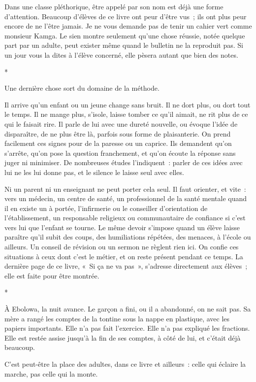 \documentclass[10.5pt,twoside,openright]{book}
\newcommand{\asterisme}{\par\vspace{0.7em}\centerline{\color{gris}*\quad*\quad*}\vspace{0.7em}\par\noindent}
\begin{document}
Dans une classe pléthorique, être appelé par son nom est déjà une forme d’attention. Beaucoup d’élèves de ce livre ont peur d’être vus ; ils ont plus peur encore de ne l’être jamais. Je ne vous demande pas de tenir un cahier vert comme monsieur Kamga. Le sien montre seulement qu’une chose réussie, notée quelque part par un adulte, peut exister même quand le bulletin ne la reproduit pas. Si un jour vous la dites à l’élève concerné, elle pèsera autant que bien des notes.

\asterisme

Une dernière chose sort du domaine de la méthode.

Il arrive qu’un enfant ou un jeune change sans bruit. Il ne dort plus, ou dort tout le temps. Il ne mange plus, s’isole, laisse tomber ce qu’il aimait, ne rit plus de ce qui le faisait rire. Il parle de lui avec une dureté nouvelle, ou évoque l’idée de disparaître, de ne plus être là, parfois sous forme de plaisanterie. On prend facilement ces signes pour de la paresse ou un caprice. Ils demandent qu’on s’arrête, qu’on pose la question franchement, et qu’on écoute la réponse sans juger ni minimiser. De nombreuses études l’indiquent : parler de ces idées avec lui ne les lui donne pas, et le silence le laisse seul avec elles.

Ni un parent ni un enseignant ne peut porter cela seul. Il faut orienter, et vite : vers un médecin, un centre de santé, un professionnel de la santé mentale quand il en existe un à portée, l’infirmerie ou le conseiller d’orientation de l’établissement, un responsable religieux ou communautaire de confiance si c’est vers lui que l’enfant se tourne. Le même devoir s’impose quand un élève laisse paraître qu’il subit des coups, des humiliations répétées, des menaces, à l’école ou ailleurs. Un conseil de révision ou un sermon ne règlent rien ici. On confie ces situations à ceux dont c’est le métier, et on reste présent pendant ce temps. La dernière page de ce livre, « Si ça ne va pas », s’adresse directement aux élèves ; elle est faite pour être montrée.

\asterisme

À Ebolowa, la nuit avance. Le garçon a fini, ou il a abandonné, on ne sait pas. Sa mère a rangé les comptes de la tontine sous la nappe en plastique, avec les papiers importants. Elle n’a pas fait l’exercice. Elle n’a pas expliqué les fractions. Elle est restée assise jusqu’à la fin de ses comptes, à côté de lui, et c’était déjà beaucoup.

C’est peut-être la place des adultes, dans ce livre et ailleurs : celle qui éclaire la marche, pas celle qui la monte.
\end{document}
